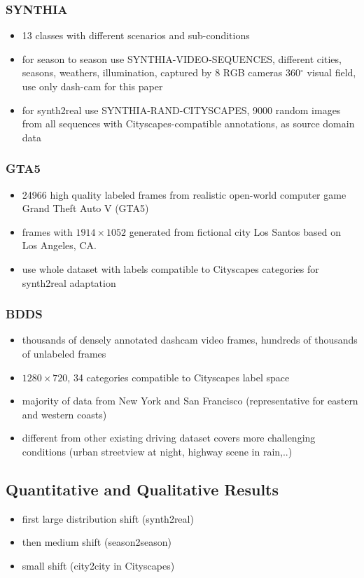 \subsubsection{SYNTHIA}
\begin{itemize}
	\item 13 classes with different scenarios and sub-conditions
	\item for season to season use SYNTHIA-VIDEO-SEQUENCES, different cities, seasons, weathers, illumination, captured by 8 RGB cameras 360$^{\circ}$ visual field, use only dash-cam for this paper
	\item for synth2real use SYNTHIA-RAND-CITYSCAPES, 9000 random images from all sequences with Cityscapes-compatible annotations, as source domain data
\end{itemize}

\subsubsection{GTA5}
\begin{itemize}
	\item 24966 high quality labeled frames from realistic open-world computer game Grand Theft Auto V (GTA5)
	\item frames with $1914 \times 1052$ generated from fictional city Los Santos based on Los Angeles, CA.
	\item use whole dataset with labels compatible to Cityscapes categories for synth2real adaptation
\end{itemize}

\subsubsection{BDDS}
\begin{itemize}
	\item thousands of densely annotated dashcam video frames, hundreds of thousands of unlabeled frames
	\item $1280 \times 720$, 34 categories compatible to Cityscapes label space
	\item majority of data from New York and San Francisco (representative for eastern and western coasts)
	\item different from other existing driving dataset covers more challenging conditions (urban streetview at night, highway scene in rain,..)
\end{itemize}

\subsection{Quantitative and Qualitative Results}
\begin{itemize}
	\item first large distribution shift (synth2real)
	\item then medium shift (season2season)
	\item small shift (city2city in Cityscapes)
\end{itemize}


